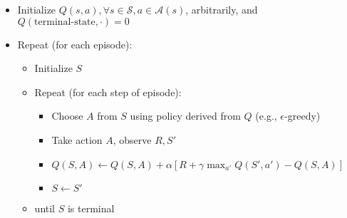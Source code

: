 \begin{itemize}
    \item Initialize $Q(s, a), \forall s \in \mathcal{S}, a \in \mathcal{A}(s)$,
          arbitrarily, and $Q(\text{terminal-state}, \cdot) = 0$
    \item Repeat (for each episode):
          \begin{itemize}
              \item Initialize $S$
              \item Repeat (for each step of episode):
                    \begin{itemize}
                        \item Choose $A$ from $S$ using policy derived from $Q$ (e.g., $\epsilon$-greedy)
                        \item Take action $A$, observe $R, S'$
                        \item $Q(S, A) \leftarrow Q(S, A) + \alpha[R + \gamma \max_{a'} Q(S', a') - Q(S, A)]$
                        \item $S \leftarrow S'$
                    \end{itemize}
              \item until $S$ is terminal
          \end{itemize}
\end{itemize}

